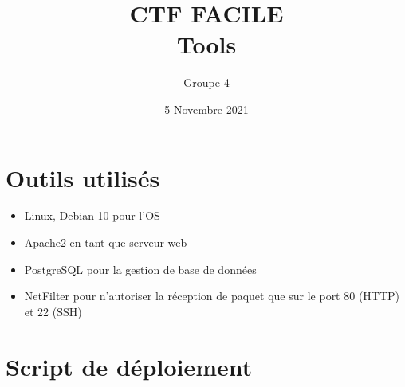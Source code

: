 \documentclass{article}
\title{\textbf{CTF FACILE}\\ \textbf{Tools}}
\author{Groupe 4}
\date{5 Novembre 2021}
\begin{document}
\maketitle

\section*{Outils utilisés}
\setlength{\parindent}{1cm}
\begin{itemize}

\item Linux, Debian 10 pour l'OS
\item Apache2 en tant que serveur web
\item PostgreSQL pour la gestion de base de données
\item NetFilter pour n'autoriser la réception de paquet que sur le port 80 (HTTP) et 22 (SSH)
\end{itemize}

\section*{Script de déploiement}

\end{document}
